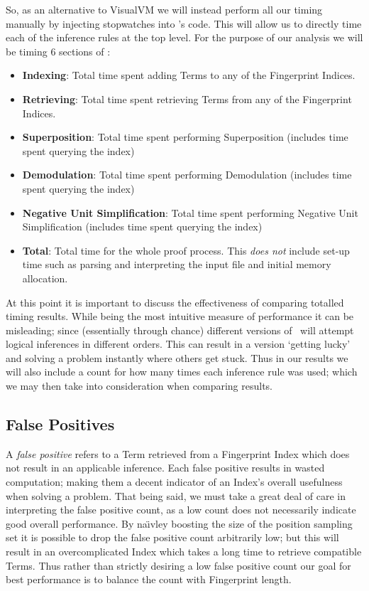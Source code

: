 So, as an alternative to VisualVM we will instead perform all our timing manually
by injecting stopwatches into \beagle's code. This will allow us to directly
time each of the inference rules at the top level. For the purpose of our analysis
we will be timing 6 sections of \beagle:
\begin{itemize}
\item \textbf{Indexing}: Total time spent adding Terms to any of the Fingerprint Indices.
\item \textbf{Retrieving}: Total time spent retrieving Terms from any of the Fingerprint Indices.
\item \textbf{Superposition}: Total time spent performing Superposition (includes time spent
querying the index)
\item \textbf{Demodulation}: Total time spent performing Demodulation (includes time spent
querying the index)
\item \textbf{Negative Unit Simplification}: Total time spent performing Negative Unit Simplification (includes time spent
querying the index)
\item \textbf{Total}: Total time for the whole proof process. This \emph{does not} include
set-up time such as parsing and interpreting the input file and initial memory allocation.
\end{itemize}
At this point it is important to discuss the effectiveness of comparing totalled timing
results. While being the most intuitive measure of performance it can be misleading;
since (essentially through chance) different versions of \beagle\ will attempt logical
inferences in different orders. This can result in a version `getting lucky' and solving
a problem instantly where others get stuck. Thus in our results we will also include
a count for how many times each inference rule was used; which we may then take
into consideration when comparing results.

\subsection{False Positives}

A \emph{false positive} refers to a Term retrieved from a Fingerprint Index which does not
result in an applicable inference. Each false positive results in wasted computation;
making them a decent indicator of an Index's overall usefulness when solving a problem. That being said,
we must take a great deal of care in interpreting the false positive count, as
a low count does not necessarily indicate good overall performance. By na\"{\i}vley
boosting the size of the position sampling set it is possible to drop the false
positive count arbitrarily low; but this will result in an overcomplicated Index which
takes a long time to retrieve compatible Terms. Thus rather than strictly desiring a
low false positive count our goal for best performance is to balance the count with Fingerprint length.


